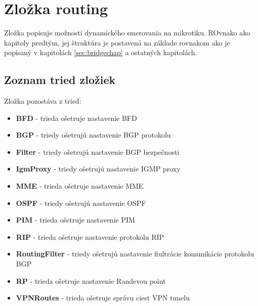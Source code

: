 \section{Zložka routing}
Zložka popisuje možnosti dynamického smerovania na mikrotiku. ROvnako ako kapitoly predtým, jej štruktúra je postavená na základe rovnakom ako je popísaný v kapitolách \ref{sec:bridgechap} a ostatných kapitolách.
\subsection{Zoznam tried zložiek}
Zložka pozostáva z tried:
\begin{itemize}
\item \textbf{BFD} - trieda ošetruje nastavenie BFD
\item \textbf{BGP} - triedy ošetrujú nastavenie BGP protokolu
\item \textbf{Filter} - triedy ošetrujú nastavenie BGP bezpečnosti
\item \textbf{IgmProxy} - triedy ošetrujú nastavenie IGMP proxy
\item \textbf{MME} - trieda ošetruje nastavenie MME
\item \textbf{OSPF} - triedy ošetrujú nastavenie OSPF
\item \textbf{PIM} - trieda ošetruje nastavenie PIM
\item \textbf{RIP} - trieda ošetruje nastavenie protokolu RIP
\item \textbf{RoutingFilter} - triedy ošetrujú nastavenie fiultrácie komunikácie protokolu BGP
\item \textbf{RP} - trieda ošetruje nastavenie Randevou point 
\item \textbf{VPNRoutes} - trieda ošetruje správu ciest VPN tunelu
\end{itemize}
